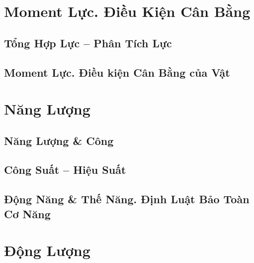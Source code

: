 \documentclass[oneside]{book}
\numberwithin{equation}{section}
\begin{document}

\chapter{Moment Lực. Điều Kiện Cân Bằng}

\section{Tổng Hợp Lực -- Phân Tích Lực}


\section{Moment Lực. Điều kiện Cân Bằng của Vật}


\chapter{Năng Lượng}

\section{Năng Lượng \& Công}


\section{Công Suất -- Hiệu Suất}


\section{Động Năng \& Thế Năng. Định Luật Bảo Toàn Cơ Năng}


\chapter{Động Lượng}
\end{document}
